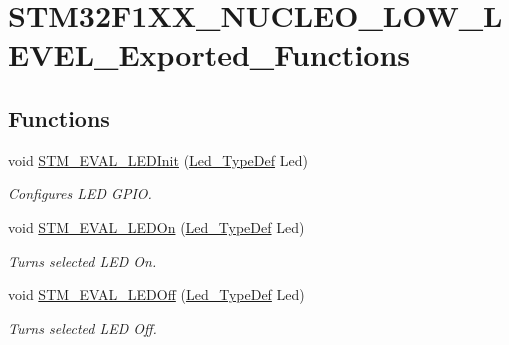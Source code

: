 \hypertarget{group___s_t_m32_f1_x_x___n_u_c_l_e_o___l_o_w___l_e_v_e_l___exported___functions}{}\section{S\+T\+M32\+F1\+X\+X\+\_\+\+N\+U\+C\+L\+E\+O\+\_\+\+L\+O\+W\+\_\+\+L\+E\+V\+E\+L\+\_\+\+Exported\+\_\+\+Functions}
\label{group___s_t_m32_f1_x_x___n_u_c_l_e_o___l_o_w___l_e_v_e_l___exported___functions}
\subsection*{Functions}
\begin{DoxyCompactItemize}
\item 
void \mbox{\hyperlink{group___s_t_m32_f1_x_x___n_u_c_l_e_o___l_o_w___l_e_v_e_l___exported___functions_ga01e1a245e786705357f741c8d42cbd3a}{S\+T\+M\+\_\+\+E\+V\+A\+L\+\_\+\+L\+E\+D\+Init}} (\mbox{\hyperlink{group___s_t_m32_f1_x_x___n_u_c_l_e_o___l_o_w___l_e_v_e_l___exported___types_gaa059704b7ca945eb9c1e7f2c3d03fecd}{Led\+\_\+\+Type\+Def}} Led)
\begin{DoxyCompactList}\small\item\em Configures L\+ED G\+P\+IO. \end{DoxyCompactList}\item 
void \mbox{\hyperlink{group___s_t_m32_f1_x_x___n_u_c_l_e_o___l_o_w___l_e_v_e_l___exported___functions_gad27fa430d867e6dde94cb7896fcc42fc}{S\+T\+M\+\_\+\+E\+V\+A\+L\+\_\+\+L\+E\+D\+On}} (\mbox{\hyperlink{group___s_t_m32_f1_x_x___n_u_c_l_e_o___l_o_w___l_e_v_e_l___exported___types_gaa059704b7ca945eb9c1e7f2c3d03fecd}{Led\+\_\+\+Type\+Def}} Led)
\begin{DoxyCompactList}\small\item\em Turns selected L\+ED On. \end{DoxyCompactList}\item 
void \mbox{\hyperlink{group___s_t_m32_f1_x_x___n_u_c_l_e_o___l_o_w___l_e_v_e_l___exported___functions_gab9ab7deafd606e72d72580ec974b7757}{S\+T\+M\+\_\+\+E\+V\+A\+L\+\_\+\+L\+E\+D\+Off}} (\mbox{\hyperlink{group___s_t_m32_f1_x_x___n_u_c_l_e_o___l_o_w___l_e_v_e_l___exported___types_gaa059704b7ca945eb9c1e7f2c3d03fecd}{Led\+\_\+\+Type\+Def}} Led)
\begin{DoxyCompactList}\small\item\em Turns selected L\+ED Off. \end{DoxyCompactList}\item 

\end{DoxyCompactItemize}
